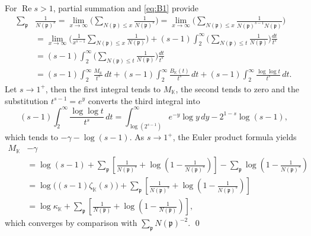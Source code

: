 \documentclass[10pt,reqno]{amsart}
\theoremstyle{plain}
\theoremstyle{definition}
\newcommand{\K}{\mathbb{K}}
\newcommand{\PP}{\mathfrak{p}}
\renewcommand{\Re}{\operatorname{Re}}
\begin{document}
For $\Re s > 1$, partial summation and \eqref{eq:B1} provide
\begin{align}
\sum_{\PP}&\frac{1}{N(\PP)^s}
= \lim_{x\to\infty} \bigg( \sum_{N(\PP)\leq x}\frac{1}{N(\PP)^s} \bigg)
= \lim_{x\to\infty} \bigg( \sum_{N(\PP)\leq x}\frac{1}{N(\PP)^{s-1} N(\PP)} \bigg) \nonumber\\
&= \lim_{x\to\infty} \bigg(\frac{1}{x^{s - 1}}\sum_{N(\PP)\leq x}\frac{1}{N(\PP)}\bigg) + (s-1) \int_{2}^{\infty}\bigg(\sum_{N(\PP)\leq t}\frac{1}{N(\PP)}\bigg) \frac{dt}{t^{s}}\nonumber\\
&=(s-1) \int_{2}^{\infty}\bigg(\sum_{N(\PP)\leq t}\frac{1}{N(\PP)}\bigg) \frac{dt}{t^{s}}\nonumber\\
&=   (s-1)\int_{2}^\infty\frac{M_{\K}}{t^{s}}\,dt
+ (s-1)\int_{2}^\infty\frac{B_{\K}(t)}{t^{s}} \,dt 
+ (s-1)\int_{2}^\infty\frac{\log\log t}{t^{s}}\,dt.\label{eqn:refmel8er}
\end{align}
Let $s \to 1^+$, then the first integral tends to $M_{\K}$, the second tends to zero and the substitution $t^{s-1} = e^y$ converts the third integral into
\begin{equation*}
(s-1)\int_{2}^{\infty}\frac{\log\log{t}}{t^{s}}\,dt
= \int_{\log(2^{s-1})}^{\infty} e^{-y} \log y \, dy - 2^{1-s} \log(s-1),
\end{equation*}
which tends to $- \gamma- \log(s-1)$.  As $s \to 1^+$, the Euler product formula yields
\begin{align}
M_{\K} &-\gamma \nonumber\\
&=\log(s-1) + \sum_{\PP}\left[ \frac{1}{N(\PP)^s} + \log\left(1 - \frac{1}{N(\PP)^s}\right) \right] - \sum_{\PP}  \log\left(1 - \frac{1}{N(\PP)^s}\right) \nonumber \\
&= \log\big((s-1)\zeta_{\K}(s)\big) + \sum_{\PP}\left[ \frac{1}{N(\PP)^s} + \log\left(1 - \frac{1}{N(\PP)^s}\right) \right] \nonumber \\
&= \log \kappa_{\K} + \sum_{\PP}\left[\frac{1}{N(\PP)} + \log\left(1 - \frac{1}{N(\PP)}\right)\right], \label{eq:MKGo1}
\end{align}
which converges by comparison with $\sum_{\PP} N(\PP)^{-2}$.   \qed

\end{document}
